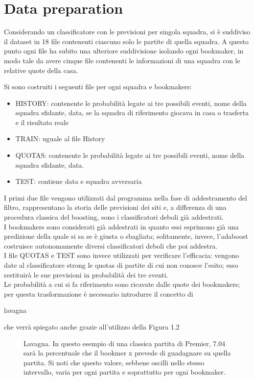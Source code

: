 \section{Data preparation}
Considerando un classificatore con le previsioni per singola squadra, 
si \`e suddiviso il dataset in 18 file contenenti ciascuno solo le partite di quella squadra.
A questo punto ogni file ha subito una ulteriore suddivisione isolando ogni bookmaker, 
in modo tale da avere cinque file contenenti le informazioni di una squadra con le relative quote della casa.

Si sono costruiti i seguenti file per ogni squadra e bookmakers:
\begin{itemize}
 \item HISTORY: contenente le probabilit\`a legate ai tre possibili eventi, nome della squadra sfidante, data, se la squadra di riferimento
 giocava in casa o trasferta e il risultato reale
\item TRAIN: uguale al file History
\item QUOTAS: contenente le probabilit\`a legate ai tre possibili eventi, nome della squadra sfidante, data.
\item TEST: contiene data e squadra avversaria
\end{itemize}

I primi due file vengono utilizzati dal programma nella fase di addestramento del filtro, rappresentano la storia delle previsioni dei siti
e, a differenza di una procedura classica del boosting, sono i classificatori deboli gi\`a addestrati.\\
\newline
I bookmakers sono considerati gi\`a addestrati in quanto essi esprimono gi\`a una predizione della quale si sa se \`e giusta o sbagliata;
solitamente, invece, l'adaboost costruisce autonomamente 
diversi classificatori deboli che poi addestra.\\
\newline
I file QUOTAS e TEST sono invece utilizzati per verificare l'efficacia: vengono date al classificatore strong le quotas 
di partite di cui non conosce l'esito; esso restituir\`a le sue previsioni in probabilit\`a dei tre eventi.\\
\newline
Le probabilit\`a a cui si fa riferimento sono ricavate dalle quote dei bookmakers;
per questa trasformazione \`e necessario introdurre il concetto di \begin{bf}lavagna\end{bf} che verr\`a spiegato anche grazie all'utilizzo 
della Figura 1.2\\
\newline
\vspace{1.5cm}
\begin{figure}
 \caption{Lavagna. In questo esempio di una classica partita di Premier, 7.04 sar\`a la percentuale che il bookmer x prevede di 
guadagnare su quella partita. Si noti che questo valore, sebbene oscilli nello stesso intervallo, varia per ogni 
partita e soprattutto per ogni bookmaker. }
 \label{fig:key}
\end{figure}





